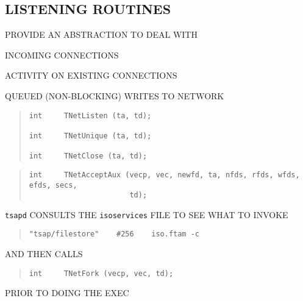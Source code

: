 \begin{bwslide}
\part*	{LISTENING ROUTINES}\bf

\begin{nrtc}
\item	PROVIDE AN ABSTRACTION TO DEAL WITH
    \begin{nrtc}
    \item	INCOMING CONNECTIONS

    \item	ACTIVITY ON EXISTING CONNECTIONS

    \item	QUEUED (NON-BLOCKING) WRITES TO NETWORK
    \end{nrtc}
\end{nrtc}
\end{bwslide}


\begin{bwslide}

\begin{quote}\small\begin{verbatim}
int     TNetListen (ta, td);

int     TNetUnique (ta, td);

int     TNetClose (ta, td);
\end{verbatim}\end{quote}
\end{bwslide}


\begin{bwslide}

\begin{quote}\small\begin{verbatim}
int     TNetAcceptAux (vecp, vec, newfd, ta, nfds, rfds, wfds, efds, secs,
                       td);
\end{verbatim}\end{quote}
\end{bwslide}


\begin{bwslide}

\begin{nrtc}
\item	\verb"tsapd" CONSULTS THE \verb"isoservices" FILE TO SEE WHAT TO
	INVOKE
\begin{quote}\small\begin{verbatim}
"tsap/filestore"    #256    iso.ftam -c
\end{verbatim}\end{quote}

\item	AND THEN CALLS
\begin{quote}\small\begin{verbatim}
int     TNetFork (vecp, vec, td);
\end{verbatim}\end{quote}
PRIOR TO DOING THE EXEC
\end{nrtc}
\end{bwslide}



